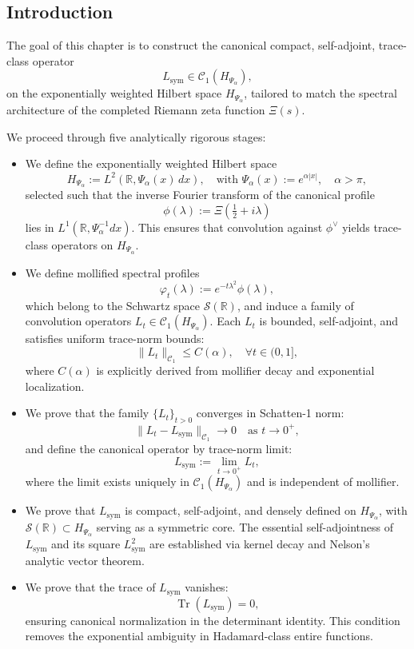 \subsection*{Introduction}

The goal of this chapter is to construct the canonical compact, self-adjoint, trace-class operator
\[
L_{\mathrm{sym}} \in \mathcal{C}_1(H_{\Psi_\alpha}),
\]
on the exponentially weighted Hilbert space \( H_{\Psi_\alpha} \), tailored to match the spectral architecture of the completed Riemann zeta function \( \Xi(s) \).

We proceed through five analytically rigorous stages:

\begin{itemize}
    \item We define the exponentially weighted Hilbert space
    \[
    H_{\Psi_\alpha} := L^2(\mathbb{R}, \Psi_\alpha(x)\, dx), \quad \text{with } \Psi_\alpha(x) := e^{\alpha |x|}, \quad \alpha > \pi,
    \]
    selected such that the inverse Fourier transform of the canonical profile
    \[
    \phi(\lambda) := \Xi\left(\tfrac{1}{2} + i\lambda\right)
    \]
    lies in \( L^1(\mathbb{R}, \Psi_\alpha^{-1} dx) \). This ensures that convolution against \( \phi^\vee \) yields trace-class operators on \( H_{\Psi_\alpha} \).

    \item We define mollified spectral profiles
    \[
    \varphi_t(\lambda) := e^{-t\lambda^2} \phi(\lambda),
    \]
    which belong to the Schwartz space \( \mathcal{S}(\mathbb{R}) \), and induce a family of convolution operators \( L_t \in \mathcal{C}_1(H_{\Psi_\alpha}) \). Each \( L_t \) is bounded, self-adjoint, and satisfies uniform trace-norm bounds:
    \[
    \| L_t \|_{\mathcal{C}_1} \le C(\alpha), \quad \forall t \in (0,1],
    \]
    where \( C(\alpha) \) is explicitly derived from mollifier decay and exponential localization.

    \item We prove that the family \( \{L_t\}_{t > 0} \) converges in Schatten-1 norm:
    \[
    \| L_t - L_{\mathrm{sym}} \|_{\mathcal{C}_1} \to 0 \quad \text{as } t \to 0^+,
    \]
    and define the canonical operator by trace-norm limit:
    \[
    L_{\mathrm{sym}} := \lim_{t \to 0^+} L_t,
    \]
    where the limit exists uniquely in \( \mathcal{C}_1(H_{\Psi_\alpha}) \) and is independent of mollifier.

    \item We prove that \( L_{\mathrm{sym}} \) is compact, self-adjoint, and densely defined on \( H_{\Psi_\alpha} \), with \( \mathcal{S}(\mathbb{R}) \subset H_{\Psi_\alpha} \) serving as a symmetric core. The essential self-adjointness of \( L_{\mathrm{sym}} \) and its square \( L_{\mathrm{sym}}^2 \) are established via kernel decay and Nelson’s analytic vector theorem.

    \item We prove that the trace of \( L_{\mathrm{sym}} \) vanishes:
    \[
    \operatorname{Tr}(L_{\mathrm{sym}}) = 0,
    \]
    ensuring canonical normalization in the determinant identity. This condition removes the exponential ambiguity in Hadamard-class entire functions.
\end{itemize}

